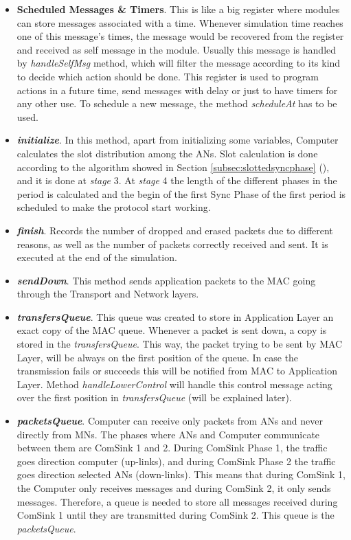 \begin{itemize}
 \item \textbf{Scheduled Messages \& Timers}. This is like a big register where modules can store messages associated with a time. Whenever 
simulation time reaches one of this message's times, the message would be recovered from the register and received as self message in the 
module. Usually this message is handled by \textit{handleSelfMsg} method, which will filter the message according to its kind to decide
which action should be done. This register is used to program actions in a future time, send messages with delay or just to have timers
for any other use. To schedule a new message, the method \textit{scheduleAt} has to be used.
 
 \item \textbf{\textit{initialize}}. In this method, apart from initializing some variables, Computer calculates the slot distribution among the 
\acp{AN}. Slot calculation is done according to the algorithm showed in Section \ref{subsec:slottedsyncphase} (),
and it is done at \textit{stage} 3. At \textit{stage} 4 the length of the different phases in the period is calculated and the begin of the first
Sync Phase of the first period is scheduled to make the protocol start working.

 \item \textbf{\textit{finish}}. Records the number of dropped and erased packets due to different reasons, as well as the number of packets
correctly received and sent. It is executed at the end of the simulation.

 \item \textbf{\textit{sendDown}}. This method sends application packets to the \ac{MAC} going through the Transport and Network layers.

 \item \textbf{\textit{transfersQueue}}. This queue was created to store in Application Layer an exact copy of the \ac{MAC} queue. Whenever a packet
is sent down, a copy is stored in the \textit{transfersQueue}. This way, the packet trying to be sent by \ac{MAC} Layer, will be always on the
first position of the queue. In case the transmission fails or succeeds this will be notified from \ac{MAC} to Application Layer. Method
\textit{handleLowerControl} will handle this control message acting over the first position in \textit{transfersQueue} (will be explained later).

 \item \textbf{\textit{packetsQueue}}. Computer can receive only packets from \acp{AN} and never directly from \acp{MN}. The phases where \acp{AN}
and Computer communicate between them are ComSink 1 and 2. During ComSink Phase 1, the traffic goes direction computer (up-links), and during
ComSink Phase 2 the traffic goes direction selected \acp{AN} (down-links). This means that during ComSink 1, the Computer only receives messages
and during ComSink 2, it only sends messages. Therefore, a queue is needed to store all messages received during ComSink 1 until they are
transmitted during ComSink 2. This queue is the \textit{packetsQueue}.


\end{itemize}

